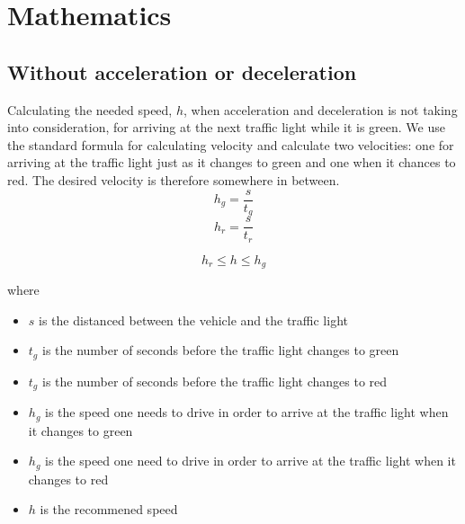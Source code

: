 \section{Mathematics}

\subsection{Without acceleration or deceleration}
Calculating the needed speed, $h$, when acceleration and deceleration is not taking into consideration, for arriving at the next traffic light while it is green.
We use the standard formula for calculating velocity and calculate two velocities: one for arriving at the traffic light just as it changes to green and one when it chances to red. The desired velocity is therefore somewhere in between.
\[h_g = \frac{s}{t_g}\]
\[h_r = \frac{s}{t_r}\]

\[h_r \leq h \leq h_g\]

where
\begin{itemize}
\item $s$ is the distanced between the vehicle and the traffic light
\item $t_g$ is the number of seconds before the traffic light changes to green
\item $t_g$ is the number of seconds before the traffic light changes to red
\item $h_g$ is the speed one needs to drive in order to arrive at the traffic light when it changes to green
\item $h_g$ is the speed one need to drive in order to arrive at the traffic light when it changes to red
\item $h$ is the recommened speed
\end{itemize}
